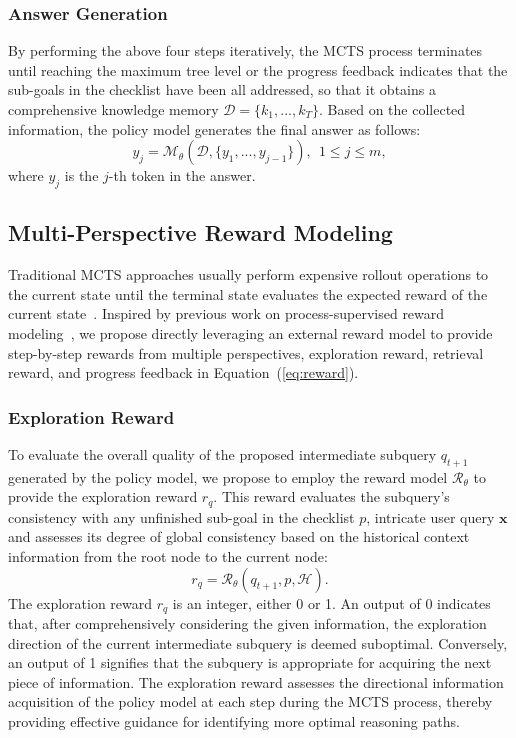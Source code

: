 \subsubsection{Answer Generation}

By performing the above four steps iteratively, the MCTS process terminates until reaching the maximum tree level or the progress feedback indicates that the sub-goals in the checklist have been all addressed, so that it obtains a comprehensive knowledge memory $\mathcal{D}=\{k_1,...,k_T\}$. Based on the collected information, the policy model generates the final answer as follows:
\begin{equation}
    y_j = \mathcal{M}_\theta(\mathcal{D}, \{y_1,...,y_{j-1}\}),~~1 \leq j \leq m,
\end{equation}
where $y_j$ is the $j$-th token in the answer.

\subsection{Multi-Perspective Reward Modeling}
\label{sec-evaluation}

Traditional MCTS approaches usually perform expensive rollout operations to the current state until the terminal state evaluates the expected reward of the current state~\cite{alphago,YeLKAG21}. Inspired by previous work on process-supervised reward modeling~\cite{setlur2024rewarding,LightmanKBEBLLS24}, we propose directly leveraging an external reward model to provide step-by-step rewards from multiple perspectives, \ie exploration reward, retrieval reward, and progress feedback in Equation~(\ref{eq:reward}).

\subsubsection{Exploration Reward}
To evaluate the overall quality of the proposed intermediate subquery $q_{t+1}$ generated by the policy model, we propose to employ the reward model $\mathcal{R}_\theta$ to provide the exploration reward $r_q$.
This reward evaluates the subquery's consistency with any unfinished sub-goal in the checklist $p$, intricate user query $\bm{x}$ and assesses its degree of global consistency based on the historical context information from the root node to the current node:
\begin{equation}
    r_{q} = \mathcal{R}_\theta(q_{t+1}, p, \mathcal{H}).
\end{equation}
The exploration reward $r_q$ is an integer, either 0 or 1. An output of 0 indicates that, after comprehensively considering the given information, the exploration direction of the current intermediate subquery is deemed suboptimal. Conversely, an output of 1 signifies that the subquery is appropriate for acquiring the next piece of information.
The exploration reward assesses the directional information acquisition of the policy model at each step during the MCTS process, thereby providing effective guidance for identifying more optimal reasoning paths.


